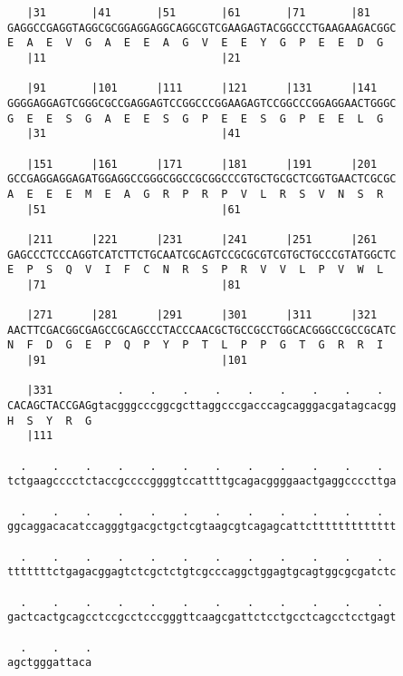 \documentclass{article}
\begin{document}
\begin{Verbatim}
   |31       |41       |51       |61       |71       |81    
GAGGCCGAGGTAGGCGCGGAGGAGGCAGGCGTCGAAGAGTACGGCCCTGAAGAAGACGGC
E  A  E  V  G  A  E  E  A  G  V  E  E  Y  G  P  E  E  D  G  
   |11                           |21                        
  
   |91       |101      |111      |121      |131      |141   
GGGGAGGAGTCGGGCGCCGAGGAGTCCGGCCCGGAAGAGTCCGGCCCGGAGGAACTGGGC
G  E  E  S  G  A  E  E  S  G  P  E  E  S  G  P  E  E  L  G  
   |31                           |41                        
  
   |151      |161      |171      |181      |191      |201   
GCCGAGGAGGAGATGGAGGCCGGGCGGCCGCGGCCCGTGCTGCGCTCGGTGAACTCGCGC
A  E  E  E  M  E  A  G  R  P  R  P  V  L  R  S  V  N  S  R  
   |51                           |61                        
  
   |211      |221      |231      |241      |251      |261   
GAGCCCTCCCAGGTCATCTTCTGCAATCGCAGTCCGCGCGTCGTGCTGCCCGTATGGCTC
E  P  S  Q  V  I  F  C  N  R  S  P  R  V  V  L  P  V  W  L  
   |71                           |81                        
  
   |271      |281      |291      |301      |311      |321   
AACTTCGACGGCGAGCCGCAGCCCTACCCAACGCTGCCGCCTGGCACGGGCCGCCGCATC
N  F  D  G  E  P  Q  P  Y  P  T  L  P  P  G  T  G  R  R  I  
   |91                           |101                       
  
   |331          .    .    .    .    .    .    .    .    .  
CACAGCTACCGAGgtacgggcccggcgcttaggcccgacccagcagggacgatagcacgg
H  S  Y  R  G                                               
   |111                                                     
  
  .    .    .    .    .    .    .    .    .    .    .    .  
tctgaagcccctctaccgccccggggtccattttgcagacggggaactgaggccccttga
  
  .    .    .    .    .    .    .    .    .    .    .    .  
ggcaggacacatccagggtgacgctgctcgtaagcgtcagagcattcttttttttttttt
  
  .    .    .    .    .    .    .    .    .    .    .    .  
tttttttctgagacggagtctcgctctgtcgcccaggctggagtgcagtggcgcgatctc
  
  .    .    .    .    .    .    .    .    .    .    .    .  
gactcactgcagcctccgcctcccgggttcaagcgattctcctgcctcagcctcctgagt
  
  .    .    .
agctgggattaca
\end{Verbatim}
\newpage
\end{document}
